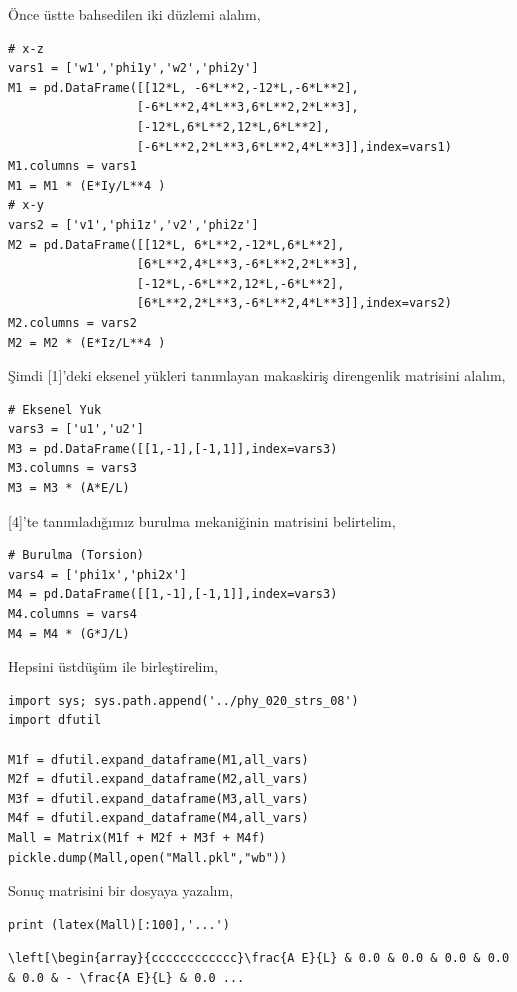 \documentclass[12pt,fleqn]{article}\usepackage{../../common}
\begin{document}
Önce üstte bahsedilen iki düzlemi alalım,

\begin{verbatim}
# x-z
vars1 = ['w1','phi1y','w2','phi2y']
M1 = pd.DataFrame([[12*L, -6*L**2,-12*L,-6*L**2],
                  [-6*L**2,4*L**3,6*L**2,2*L**3],
                  [-12*L,6*L**2,12*L,6*L**2],
                  [-6*L**2,2*L**3,6*L**2,4*L**3]],index=vars1)
M1.columns = vars1
M1 = M1 * (E*Iy/L**4 )
# x-y
vars2 = ['v1','phi1z','v2','phi2z']
M2 = pd.DataFrame([[12*L, 6*L**2,-12*L,6*L**2],
                  [6*L**2,4*L**3,-6*L**2,2*L**3],
                  [-12*L,-6*L**2,12*L,-6*L**2],
                  [6*L**2,2*L**3,-6*L**2,4*L**3]],index=vars2)
M2.columns = vars2
M2 = M2 * (E*Iz/L**4 )
\end{verbatim}

Şimdi [1]'deki eksenel yükleri tanımlayan makaskiriş direngenlik matrisini
alalım,

\begin{verbatim}
# Eksenel Yuk
vars3 = ['u1','u2']
M3 = pd.DataFrame([[1,-1],[-1,1]],index=vars3)
M3.columns = vars3
M3 = M3 * (A*E/L)
\end{verbatim}

[4]'te tanımladığımız burulma mekaniğinin matrisini belirtelim,

\begin{verbatim}
# Burulma (Torsion)
vars4 = ['phi1x','phi2x']
M4 = pd.DataFrame([[1,-1],[-1,1]],index=vars3)
M4.columns = vars4
M4 = M4 * (G*J/L)
\end{verbatim}

Hepsini üstdüşüm ile birleştirelim,

\begin{verbatim}
import sys; sys.path.append('../phy_020_strs_08')
import dfutil

M1f = dfutil.expand_dataframe(M1,all_vars)
M2f = dfutil.expand_dataframe(M2,all_vars)
M3f = dfutil.expand_dataframe(M3,all_vars)
M4f = dfutil.expand_dataframe(M4,all_vars)
Mall = Matrix(M1f + M2f + M3f + M4f)
pickle.dump(Mall,open("Mall.pkl","wb"))
\end{verbatim}

Sonuç matrisini bir dosyaya yazalım, 

\begin{verbatim}
print (latex(Mall)[:100],'...')
\end{verbatim}

\begin{verbatim}
\left[\begin{array}{cccccccccccc}\frac{A E}{L} & 0.0 & 0.0 & 0.0 & 0.0 & 0.0 & - \frac{A E}{L} & 0.0 ...
\end{verbatim}
\end{document}
